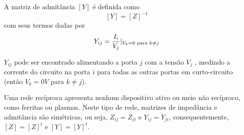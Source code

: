 A matriz de admitância $\left[Y\right]$ é definida como
\begin{equation*}
	\left[Y\right]=\left[Z\right]^{-1}
\end{equation*}
com seus termos dadas por
\begin{equation*}
	Y_{ij}=\displaystyle \frac{\displaystyle I_i }{ \displaystyle V_j}|_{V_k=0\text{ para }k\neq j}
\end{equation*}


$Y_{ij}$ pode ser encontrado alimentando a porta $j$ com a tensão $V_j$ , medindo a corrente do
circuito na porta $i$ para todas as outras portas em curto-circuito (então $V_k = 0V$ para $k \neq j$).


Uma rede recíproca apresenta nenhum dispositivo ativo ou meio não
recíproco, como ferritas ou plasmas. Neste tipo de rede, 
matrizes de impedância e admitância são
simétricas, ou seja, $Z_{ij}=Z_{ji}$ e $Y_{ij}=Y_{ji}$, consequentemente, $\left[Z\right]=\left[Z\right]^t$ e $\left[Y\right]=\left[Y\right]^t$.


